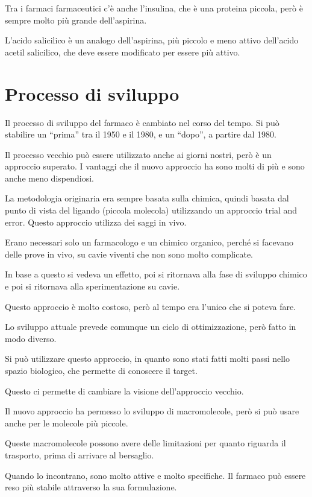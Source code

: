 Tra i farmaci farmaceutici c'è anche l'insulina, che è una proteina
piccola, però è sempre molto più grande dell'aspirina.

L'acido salicilico è un analogo dell'aspirina, più piccolo e meno attivo
dell'acido acetil salicilico, che deve essere modificato per essere più
attivo.

\section{Processo di sviluppo}

Il processo di sviluppo del farmaco è cambiato nel corso del tempo. Si
può stabilire un ``prima'' tra il 1950 e il 1980, e un ``dopo'', a
partire dal 1980.

Il processo vecchio può essere utilizzato anche ai giorni nostri, però è
un approccio superato. I vantaggi che il nuovo approccio ha sono molti
di più e sono anche meno dispendiosi.

La metodologia originaria era sempre basata sulla chimica, quindi basata
dal punto di vista del ligando (piccola molecola) utilizzando un
approccio trial and error. Questo approccio utilizza dei saggi in vivo.

Erano necessari solo un farmacologo e un chimico organico, perché si
facevano delle prove in vivo, su cavie viventi che non sono molto
complicate.

In base a questo si vedeva un effetto, poi si ritornava alla fase di
sviluppo chimico e poi si ritornava alla sperimentazione su cavie.

Questo approccio è molto costoso, però al tempo era l'unico che si
poteva fare.

Lo sviluppo attuale prevede comunque un ciclo di ottimizzazione, però
fatto in modo diverso.

Si può utilizzare questo approccio, in quanto sono stati fatti molti
passi nello spazio biologico, che permette di conoscere il target.

Questo ci permette di cambiare la visione dell'approccio vecchio.

Il nuovo approccio ha permesso lo sviluppo di macromolecole, però si può
usare anche per le molecole più piccole.

Queste macromolecole possono avere delle limitazioni per quanto riguarda
il trasporto, prima di arrivare al bersaglio.

Quando lo incontrano, sono molto attive e molto specifiche. Il farmaco
può essere reso più stabile attraverso la sua formulazione.


